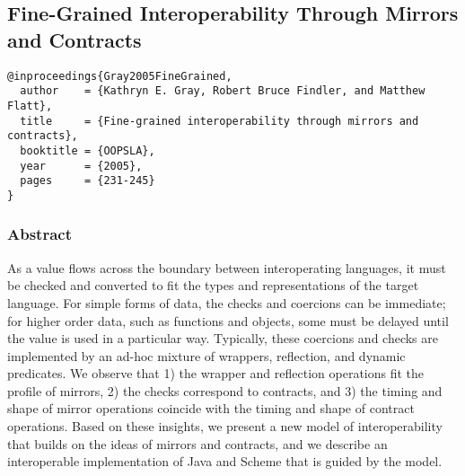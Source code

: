 \documentclass[12pt]{article}	%
\begin{document}
%
%
%
%




\subsection*{Fine-Grained Interoperability Through Mirrors and Contracts~\cite{Gray2005FineGrained}}

\begin{verbatim}
@inproceedings{Gray2005FineGrained,
  author    = {Kathryn E. Gray, Robert Bruce Findler, and Matthew Flatt},
  title     = {Fine-grained interoperability through mirrors and contracts},
  booktitle = {OOPSLA},
  year      = {2005},
  pages     = {231-245}
}
\end{verbatim}

\subsubsection*{Abstract}
As a value flows across the boundary between interoperating languages, it must be checked and converted to fit the types and representations of the target language. For simple forms of data, the checks and coercions can be immediate; for higher order data, such as functions and objects, some must be delayed until the value is used in a particular way. Typically, these coercions and checks are implemented by an ad-hoc mixture of wrappers, reflection, and dynamic predicates. We observe that 1) the wrapper and reflection operations fit the profile of mirrors, 2) the checks correspond to contracts, and 3) the timing and shape of mirror operations coincide with the timing and shape of contract operations. Based on these insights, we present a new model of interoperability that builds on the ideas of mirrors and contracts, and we describe an interoperable implementation of Java and Scheme that is guided by the model.
\end{document}
